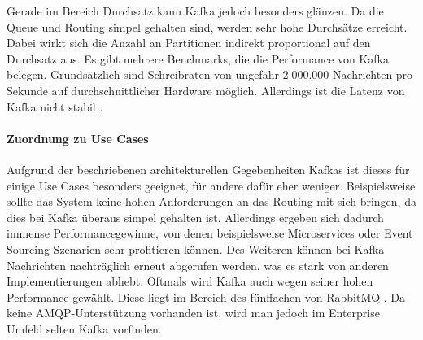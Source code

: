 Gerade im Bereich Durchsatz kann Kafka jedoch besonders glänzen. Da die Queue und
Routing simpel gehalten sind, werden sehr hohe Durchsätze erreicht.
Dabei wirkt sich die Anzahl an Partitionen indirekt proportional auf den Durchsatz aus.
Es gibt mehrere Benchmarks, die die Performance von Kafka belegen.
Grundsätzlich sind Schreibraten von ungefähr 2.000.000 Nachrichten pro Sekunde
auf durchschnittlicher Hardware möglich. Allerdings ist die Latenz von Kafka
nicht stabil \cite{Linkedin:online, dobbelaere2017kafka}.
\paragraph{Zuordnung zu Use Cases}
Aufgrund der beschriebenen architekturellen Gegebenheiten Kafkas ist dieses für
einige Use Cases besonders geeignet, für andere dafür eher weniger.
Beispielsweise sollte das System keine hohen Anforderungen an das Routing mit sich bringen,
da dies bei Kafka überaus simpel gehalten ist. Allerdings ergeben sich dadurch immense
Performancegewinne, von denen beispielsweise Microservices oder Event Sourcing Szenarien
sehr profitieren können. Des Weiteren können bei Kafka Nachrichten nachträglich erneut
abgerufen werden, was es stark von anderen Implementierungen abhebt.
Oftmals wird Kafka auch wegen seiner hohen Performance gewählt. Diese liegt im
Bereich des fünffachen von RabbitMQ \cite{dobbelaere2017kafka}.
Da keine AMQP-Unterstützung vorhanden ist, wird man jedoch im Enterprise Umfeld
selten Kafka vorfinden.
